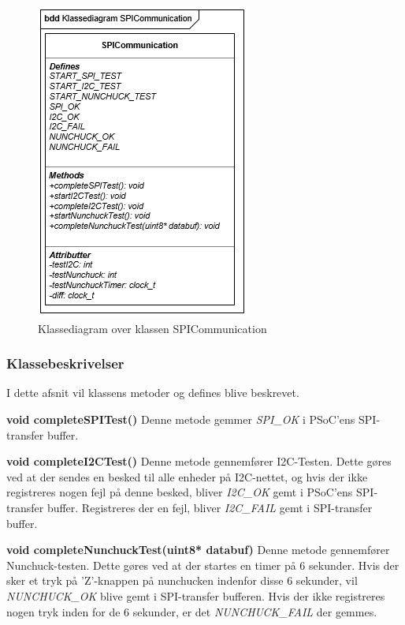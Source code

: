 \begin{figure}[H]
	\centering
	\includegraphics[]{DesignOgImplementering/images/SPICommunication}
	\caption{Klassediagram over klassen SPICommunication}
	\label{figure:KlassediagramSPICommunication}
\end{figure}
\subsubsection{Klassebeskrivelser}
I dette afsnit vil klassens metoder og defines blive beskrevet.
\newline

\noindent\textbf{void completeSPITest()} \newline
Denne metode gemmer \textit{SPI\_OK} i PSoC'ens SPI-transfer buffer. \newline

\noindent\textbf{void completeI2CTest()} \newline
Denne metode gennemfører I2C-Testen. Dette gøres ved at der sendes en besked til alle enheder på I2C-nettet, og hvis der ikke registreres nogen fejl på denne besked, bliver \textit{I2C\_OK} gemt i PSoC'ens SPI-transfer buffer. Registreres der en fejl, bliver \textit{I2C\_FAIL} gemt i SPI-transfer buffer. \newline

\noindent\textbf{void completeNunchuckTest(uint8* databuf)} \newline
Denne metode gennemfører Nunchuck-testen. Dette gøres ved at der startes en timer på 6 sekunder. Hvis der sker et tryk på 'Z'-knappen på nunchucken indenfor disse 6 sekunder, vil \textit{NUNCHUCK\_OK} blive gemt i SPI-transfer bufferen. Hvis der ikke registreres nogen tryk inden for de 6 sekunder, er det \textit{NUNCHUCK\_FAIL} der gemmes.\newline

